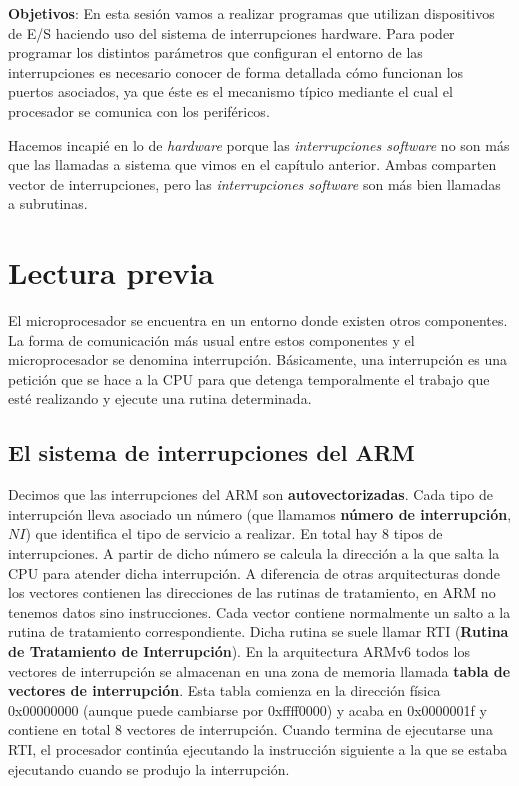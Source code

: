 \label{chp:Interrupciones}
\minitoc

{\bf Objetivos}: En esta sesión vamos a realizar programas que
utilizan dispositivos de E/S haciendo uso del sistema de
interrupciones hardware. Para poder programar los distintos parámetros
que configuran el entorno de las interrupciones es necesario conocer de
forma detallada cómo funcionan los puertos asociados, ya que
éste es el mecanismo típico mediante el cual el procesador se
comunica con los periféricos.

Hacemos incapié en lo de {\it hardware} porque las
{\it interrupciones software} no son más que las llamadas a sistema
que vimos en el capítulo anterior. Ambas comparten vector de interrupciones,
pero las {\it interrupciones software} son más bien llamadas a subrutinas.

\section{Lectura previa}

El microprocesador se encuentra en un entorno donde existen otros
componentes. La forma de comunicación más usual entre estos
componentes y el microprocesador se denomina interrupción.
Básicamente, una interrupción es una petición que se hace a la CPU
para que detenga temporalmente el trabajo que esté realizando y
ejecute una rutina determinada. 

\subsection{El sistema de interrupciones del ARM}

Decimos que las interrupciones del ARM son {\bf autovectorizadas}.
Cada tipo de interrupción lleva asociado un número (que llamamos
{\bf número de interrupción}, $NI$) que identifica el tipo de servicio a
realizar. En total hay 8 tipos de interrupciones.
A partir de dicho número se calcula la dirección a la que salta la CPU
para atender dicha interrupción. A diferencia de otras arquitecturas
donde los vectores contienen las direcciones de las rutinas de
tratamiento, en ARM no tenemos datos sino instrucciones. Cada vector
contiene normalmente un salto a la rutina de tratamiento correspondiente.
Dicha rutina se suele llamar RTI ({\bf Rutina
de Tratamiento de Interrupción}). En la arquitectura ARMv6
todos los vectores de interrupción se almacenan en una zona de memoria
llamada {\bf tabla de vectores de interrupción}. Esta tabla comienza
en la dirección física 0x00000000 (aunque puede cambiarse por
0xffff0000) y acaba en 0x0000001f y contiene en total 8 vectores de
interrupción. Cuando termina de ejecutarse una RTI,
el procesador continúa ejecutando la instrucción siguiente a la que se
estaba ejecutando cuando se produjo la interrupción.

